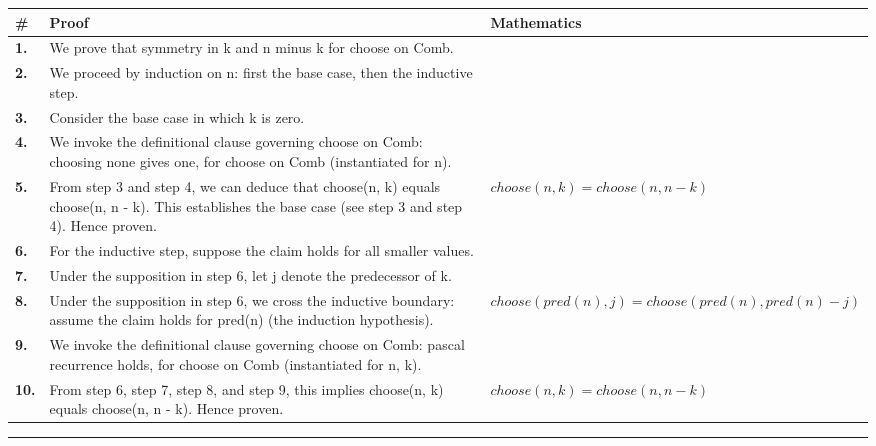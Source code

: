 \documentclass[11pt]{article}
\theoremstyle{definition}
\begin{document}
\begin{tabular}{@{} >{\raggedright\arraybackslash}p{} >{\raggedright\arraybackslash}p{} >{\raggedleft\arraybackslash}p{} @{}}
\textbf{\#} & \textbf{Proof} & \textbf{Mathematics} \\
\midrule
\textbf{1.} & We prove that symmetry in k and n minus k for choose on Comb. & \\[0.45em]
\textbf{2.} & We proceed by induction on n: first the base case, then the inductive step. & \\[0.45em]
\textbf{3.} & Consider the base case in which k is zero. & \\[0.45em]
\textbf{4.} & We invoke the definitional clause governing choose on Comb: choosing none gives one, for choose on Comb (instantiated for n). & \\[0.45em]
\textbf{5.} & From step 3 and step 4, we can deduce that choose(n, k) equals choose(n, n - k). This establishes the base case (see step 3 and step 4). Hence proven. & $\displaystyle choose(n, k) = choose(n, n - k)$ \\[0.45em]
\textbf{6.} & For the inductive step, suppose the claim holds for all smaller values. & \\[0.45em]
\textbf{7.} & Under the supposition in step 6, let j denote the predecessor of k. & \\[0.45em]
\textbf{8.} & Under the supposition in step 6, we cross the inductive boundary: assume the claim holds for pred(n) (the induction hypothesis). & $\displaystyle choose(pred(n), j) = choose(pred(n), pred(n) - j)$ \\[0.45em]
\textbf{9.} & We invoke the definitional clause governing choose on Comb: pascal recurrence holds, for choose on Comb (instantiated for n, k). & \\[0.45em]
\textbf{10.} & From step 6, step 7, step 8, and step 9, this implies choose(n, k) equals choose(n, n - k). Hence proven. & $\displaystyle choose(n, k) = choose(n, n - k)$ \\[0.45em]
\bottomrule
\end{tabular}
\label{thm:Comb-choose-symmetry_in_k_and_n_minus_k}
\par\medskip\hrule
\end{document}
